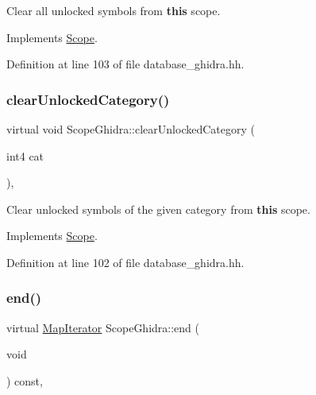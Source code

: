 Clear all unlocked symbols from {\bfseries{this}} scope. 



Implements \mbox{\hyperlink{class_scope_ac7d58385a87dca33d128300c666e5064}{Scope}}.



Definition at line 103 of file database\+\_\+ghidra.\+hh.

\mbox{\label{class_scope_ghidra_a1c8f2ce3c7783b86d375bc6d702c461c}} 
\subsubsection{\texorpdfstring{clearUnlockedCategory()}{clearUnlockedCategory()}}
{\footnotesize\ttfamily virtual void Scope\+Ghidra\+::clear\+Unlocked\+Category (\begin{DoxyParamCaption}\item[{int4}]{cat }\end{DoxyParamCaption})\hspace{0.3cm}{\ttfamily [inline]}, {\ttfamily [virtual]}}



Clear unlocked symbols of the given category from {\bfseries{this}} scope. 



Implements \mbox{\hyperlink{class_scope_a15fc66a463ca11a4c533991cea0639c8}{Scope}}.



Definition at line 102 of file database\+\_\+ghidra.\+hh.

\mbox{\label{class_scope_ghidra_a7cf4b95214a2232a84e36ea5bfdd368c}} 
\subsubsection{\texorpdfstring{end()}{end()}}
{\footnotesize\ttfamily virtual \mbox{\hyperlink{class_map_iterator}{Map\+Iterator}} Scope\+Ghidra\+::end (\begin{DoxyParamCaption}\item[{void}]{ }\end{DoxyParamCaption}) const\hspace{0.3cm}{\ttfamily [inline]}, {\ttfamily [virtual]}}



